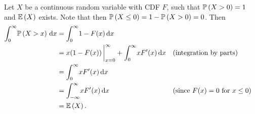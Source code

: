 \begin{ex}
  Let $X$ be a continuous random variable with CDF $F$, such that $\P{X>0}=1$
  and $\E{X}$ exists. Note that then $\P{X\leq 0}=1-\P{X>0}=0$. Then
  \begin{align*}
    \int_{0}^\infty\! \P{X>x}\,\d{x}
     & =\int_{0}^\infty\! 1-F(x)\,\d{x}                                                                                \\
     & =x(1-F(x))\,\bigg\rvert_{x=0}^\infty+\int_{0}^\infty\! xF'(x)\,\d{x} &  & (\text{integration by parts})         \\
     & =\int_{0}^\infty\! xF'(x)\,\d{x}                                                                                \\
     & =\int_{-\infty}^\infty\! xF'(x)\,\d{x}                               &  & (\text{since $F(x)=0$ for $x\leq 0$}) \\
     & =\E{X}.
  \end{align*}

\end{ex}

